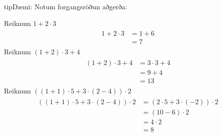 \documentclass[a4paper,10pt,icelandic]{sphinxmanual}
\begin{document}
\begin{sphinxadmonition}{tip}{Dæmi:}
Notum forgangsröðun aðgerða:

 Reiknum \(1+2 \cdot 3\)
\begin{equation*}
\begin{split}\begin{aligned}
        1+2 \cdot 3&=1+6\\
        &=7
\end{aligned}\end{split}
\end{equation*}
 Reiknum \((1+2)\cdot 3+4\)
\begin{equation*}
\begin{split}\begin{aligned}
        (1+2)\cdot 3+4&= 3 \cdot 3+4\\
        &=9+4 \\
        &= 13
\end{aligned}\end{split}
\end{equation*}
 Reiknum \(((1+1) \cdot 5+3 \cdot (2-4))\cdot 2\)
\begin{equation*}
\begin{split}\begin{aligned}
        ((1+1) \cdot 5+3 \cdot (2-4))\cdot 2 &=(2 \cdot 5+3 \cdot (-2)) \cdot 2\\
        & = (10-6) \cdot 2\\
        &=4 \cdot 2\\
        &=8
\end{aligned}\end{split}
\end{equation*}\end{sphinxadmonition}
\end{document}
